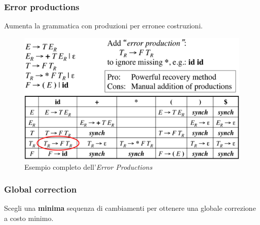 \subsubsection{Error productions}
Aumenta la grammatica con produzioni per erronee costruzioni.

\begin{figure}[H]
\begin{center}
\includegraphics[scale=0.4]{res/image/example_error_productions}
\end{center}
\caption{Esempio completo dell'\textit{Error Productions}}
\label{img:example_error_productions}
\end{figure}


\subsubsection{Global correction}
Scegli una \textbf{minima} sequenza di cambiamenti per ottenere una globale
correzione a costo minimo.
